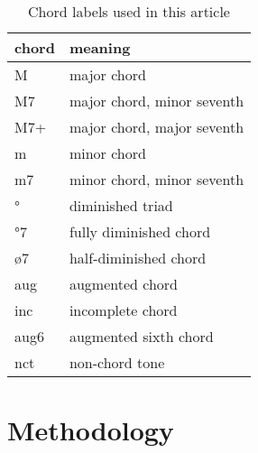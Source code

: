 \documentclass{article}
\begin{document}
\begin{table}
\centering
\begin{tabular}{l|l}
chord & meaning \\ \hline
    M & major chord \\
   M7 & major chord, minor seventh \\
  M7+ & major chord, major seventh \\
    m & minor chord \\
   m7 & minor chord, minor seventh \\
    ° & diminished triad \\
   °7 & fully diminished chord \\
   ø7 & half-diminished chord \\
  aug & augmented chord \\
  inc & incomplete chord \\
 aug6 & augmented sixth chord \\
  nct & non-chord tone \\
\end{tabular}
\caption{Chord labels used in this article}
\label{tab:legenda}
\end{table}

\section{Methodology}
\label{sec:methodology}
\end{document}
